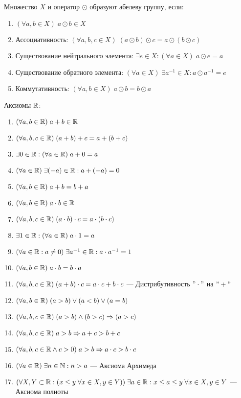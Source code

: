 \documentclass{article}
\begin{document}


Множество $X$ и оператор $\odot$ образуют абелеву группу, если:

\begin{enumerate}[label=\Roman*.]
	\item$(\forall a, b\in X)\;a\odot b\in X$
	\item{}Ассоциативность: $(\forall a,b,c\in X)\;(a\odot b)\odot c=a\odot(b\odot c)$
	\item{}Существование нейтрального элемента: $\exists e\in X:(\forall a\in X)\;a\odot e=a$
	\item{}Существование обратного элемента: $(\forall a\in X)\;\exists a^{-1}\in X:a\odot a^{-1}=e$
	\item{}Коммутативность: $(\forall a, b\in X)\;a\odot b=b\odot a$
\end{enumerate}


Аксиомы $\mathbb{R}$:

\begin{enumerate}[label=\Roman*.]
	\item{}$(\forall a, b\in\mathbb{R})\;a+b\in\mathbb{R}$
	\item$(\forall a,b,c\in\mathbb{R})\;(a+b)+c=a+(b+c)$
	\item$\exists 0\in\mathbb{R}:(\forall a\in\mathbb{R})\;a+0=a$
	\item$(\forall a\in\mathbb{R})\;\exists (-a)\in\mathbb{R}:a+(-a)=0$
	\item{}$(\forall a, b\in\mathbb{R})\;a+b=b+a$
	\item{}$(\forall a, b\in \mathbb{R})\;a\cdot b\in \mathbb{R}$
	\item$(\forall a,b,c\in \mathbb{R})\;(a\cdot b)\cdot c=a\cdot(b\cdot c)$
	\item$\exists 1\in \mathbb{R}:(\forall a\in \mathbb{R})\;a\cdot 1=a$
	\item$(\forall a\in \mathbb{R}:a\neq 0)\;\exists a^{-1}\in \mathbb{R}:a\cdot a^{-1}=1$
	\item{}$(\forall a, b\in \mathbb{R})\;a\cdot b=b\cdot a$
	\item$(\forall a,b,c\in\mathbb{R})\;(a+b)\cdot c=a\cdot c+b\cdot c$ --- Дистрибутивность $"\cdot"$ на $"+"$
	\item{}$(\forall a,b\in\mathbb{R})\;(a>b)\lor (a<b)\lor (a=b)$
	\item$(\forall a,b,c\in\mathbb{R})\;(a>b)\land(b>c)\Rightarrow (a>c)$
	\item$(\forall a,b,c\in\mathbb{R})\;a>b\Rightarrow a+c>b+c$
	\item{}$(\forall a,b,c\in\mathbb{R} \land c>0)\;a>b\Rightarrow a\cdot c>b\cdot c$
	\item$(\forall a\in\mathbb{R})\;\exists n\in\mathbb{N}:n>a$ --- Аксиома Архимеда
	\item$(\forall X,Y\subset\mathbb{R}:(x\leq y\;\forall x\in X,y\in Y))\;
		\exists a\in\mathbb{R}: x\leq a\leq y\;\forall x\in X,y\in Y$ --- Аксиома полноты
\end{enumerate}
\end{document}
